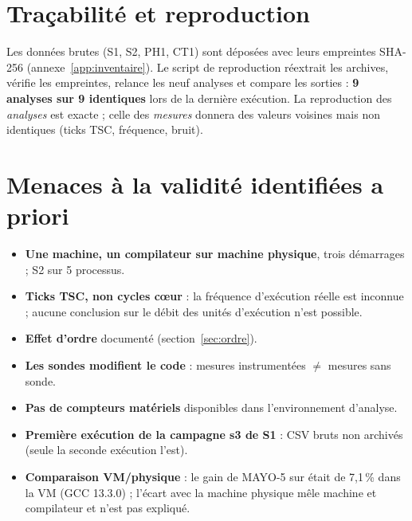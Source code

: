 \section{Traçabilité et reproduction}
Les données brutes (S1, S2, PH1, CT1) sont déposées avec leurs empreintes SHA-256 (annexe~\ref{app:inventaire}). Le script de reproduction réextrait les archives, vérifie les empreintes, relance les neuf analyses et compare les sorties : \textbf{9 analyses sur 9 identiques} lors de la dernière exécution. La reproduction des \emph{analyses} est exacte ; celle des \emph{mesures} donnera des valeurs voisines mais non identiques (ticks TSC, fréquence, bruit).

\section{Menaces à la validité identifiées a priori}
\begin{itemize}
\item \textbf{Une machine, un compilateur sur machine physique}, trois démarrages ; S2 sur 5 processus.
\item \textbf{Ticks TSC, non cycles cœur} : la fréquence d'exécution réelle est inconnue ; aucune conclusion sur le débit des unités d'exécution n'est possible.
\item \textbf{Effet d'ordre} documenté (section~\ref{sec:ordre}).
\item \textbf{Les sondes modifient le code} : mesures instrumentées $\ne$ mesures sans sonde.
\item \textbf{Pas de compteurs matériels} disponibles dans l'environnement d'analyse.
\item \textbf{Première exécution de la campagne s3 de S1} : CSV bruts non archivés (seule la seconde exécution l'est).
\item \textbf{Comparaison VM/physique} : le gain de MAYO-5 sur  était de 7,1\,\% dans la VM (GCC 13.3.0) ; l'écart avec la machine physique mêle machine et compilateur et n'est pas expliqué.
\end{itemize}

